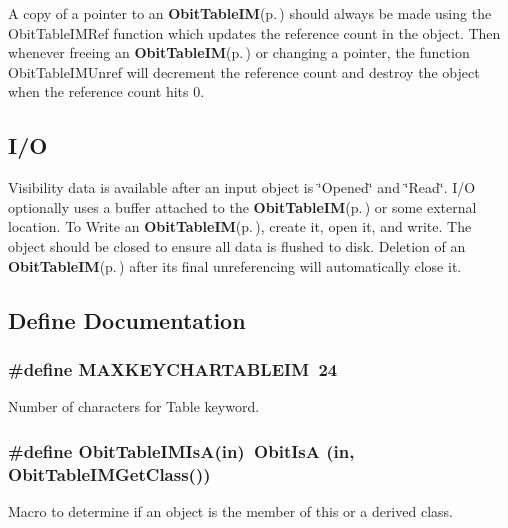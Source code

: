 A copy of a pointer to an {\bf Obit\-Table\-IM}{\rm (p.\,\pageref{structObitTableIM})} should always be made using the Obit\-Table\-IMRef function which updates the reference count in the object. Then whenever freeing an {\bf Obit\-Table\-IM}{\rm (p.\,\pageref{structObitTableIM})} or changing a pointer, the function Obit\-Table\-IMUnref will decrement the reference count and destroy the object when the reference count hits 0.\subsection{I/O}\label{ObitTableIM_8h_ObitTableIMUsage}
Visibility data is available after an input object is \char`\"{}Opened\char`\"{} and \char`\"{}Read\char`\"{}. I/O optionally uses a buffer attached to the {\bf Obit\-Table\-IM}{\rm (p.\,\pageref{structObitTableIM})} or some external location. To Write an {\bf Obit\-Table\-IM}{\rm (p.\,\pageref{structObitTableIM})}, create it, open it, and write. The object should be closed to ensure all data is flushed to disk. Deletion of an {\bf Obit\-Table\-IM}{\rm (p.\,\pageref{structObitTableIM})} after its final unreferencing will automatically close it.

\subsection{Define Documentation}
\subsubsection{\setlength{\rightskip}{0pt plus 5cm}\#define MAXKEYCHARTABLEIM\ 24}\label{ObitTableIM_8h_a0}


Number of characters for Table keyword. 

\subsubsection{\setlength{\rightskip}{0pt plus 5cm}\#define Obit\-Table\-IMIs\-A(in)\ Obit\-Is\-A (in, Obit\-Table\-IMGet\-Class())}\label{ObitTableIM_8h_a3}


Macro to determine if an object is the member of this or a derived class. 

